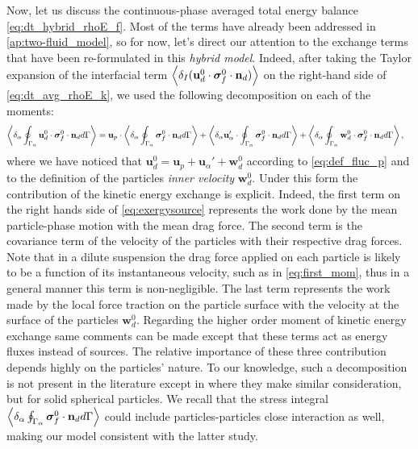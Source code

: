 Now, let us discuss the continuous-phase averaged total energy balance \eqref{eq:dt_hybrid_rhoE_f}. 
Most of the terms have already been addressed in \ref{ap:two-fluid_model}, so for now, let's direct our attention to the exchange terms that have been re-formulated in this \textit{hybrid model}. 
Indeed, after taking the Taylor expansion of the interfacial term $\left<\delta_I (\textbf{u}^0_d \cdot \bm{\sigma}_f^0 \cdot \textbf{n}_d)\right>$ on the right-hand side of \ref{eq:dt_avg_rhoE_k}, we used the following decomposition on each of the moments:
\begin{align}
    \label{eq:exergysource}
    \left<\delta_\alpha  \oint_{\Gamma_{\alpha}} \textbf{u}^0_d \cdot \bm{\sigma}_f^0 \cdot \textbf{n}_d d\Gamma\right>
    &= 
    \textbf{u}_p \cdot \left<\delta_\alpha \oint_{\Gamma_{\alpha}} {\bm{\sigma}_f^0 \cdot \textbf{n}_d} d\Gamma\right>
    + \left<\delta_\alpha  \textbf{u}_\alpha' \cdot \oint_{\Gamma_{\alpha}}   \bm{\sigma}_f^0 \cdot \textbf{n}_d d\Gamma\right>
    + \left<\delta_\alpha  \oint_{\Gamma_{\alpha}} \textbf{w}_d^0 \cdot \bm{\sigma}_f^0 \cdot \textbf{n}_d d\Gamma\right>,
\end{align}
where we have noticed that $\textbf{u}_d^0 = \textbf{u}_p + \textbf{u}_\alpha' +\textbf{w}_d^0$ according to \ref{eq:def_fluc_p} and to the definition of the particles \textit{inner velocity} $\textbf{w}_d^0$. 
Under this form the contribution of the kinetic energy exchange is explicit. 
Indeed, the first term on the right hands side of \ref{eq:exergysource} represents the work done by the mean particle-phase motion with the mean drag force.
The second term is the covariance term of the velocity of the particles with their respective drag forces.
Note that in a dilute suspension the drag force applied on each particle is likely to be a function of its instantaneous velocity, such as in \ref{eq:first_mom}, thus in a general manner this term is non-negligible. 
The last term represents the work made by the local force traction on the particle surface with the velocity at the surface of the particles $\textbf{w}_d^0$.
Regarding the higher order moment of kinetic energy exchange same comments can be made except that these terms act as energy fluxes instead of sources. 
The relative importance of these three contribution depends highly on the particles' nature. 
To our knowledge, such a decomposition is not present in the literature except in \citep[Chapter 2]{scorsim2021particle} where they make similar consideration, but for solid spherical particles.
We recall that the stress integral $\left<\delta_\alpha \oint_{\Gamma_{\alpha}} \bm{\sigma}_f^0 \cdot \textbf{n}_d d\Gamma\right>$ could include particles-particles close interaction as well, making our model consistent with the latter study.

